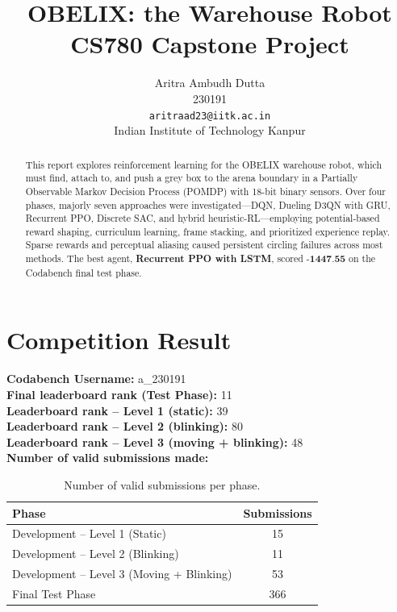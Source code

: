\documentclass[10.5pt, oneside]{article}
\title{OBELIX: the Warehouse Robot \\ \Large{CS780 Capstone Project}
}
\author{
    Aritra Ambudh Dutta  \\
    230191\\
   {\tt aritraad23@iitk.ac.in}\\
{Indian Institute of Technology Kanpur}
}
\date{}
\begin{document}
\maketitle

\begin{abstract}
This report explores reinforcement learning for the OBELIX warehouse robot, which must find, attach to, and push a grey box to the arena boundary in a Partially Observable Markov Decision Process (POMDP) with 18-bit binary sensors. Over four phases, majorly seven approaches were investigated---DQN, Dueling D3QN with GRU, Recurrent PPO, Discrete SAC, and hybrid heuristic-RL---employing potential-based reward shaping, curriculum learning, frame stacking, and prioritized experience replay. Sparse rewards and perceptual aliasing caused persistent circling failures across most methods. The best agent, \textbf{Recurrent PPO with LSTM}, scored $\textbf{-1447.55}$ on the Codabench final test phase.
\end{abstract}

\section{Competition Result}
\textbf{Codabench Username:} a\_230191 \\
\textbf{Final leaderboard rank (Test Phase):} 11 \\
\textbf{Leaderboard rank -- Level 1 (static):} 39 \\
\textbf{Leaderboard rank -- Level 2 (blinking):} 80 \\
\textbf{Leaderboard rank -- Level 3 (moving + blinking):} 48 \\

\textbf{Number of valid submissions made:}

\begin{table}[H]
\centering
\begin{tabular}{l c}
\toprule
\textbf{Phase} & \textbf{Submissions} \\
\midrule
Development -- Level 1 (Static) & 15 \\
Development -- Level 2 (Blinking) & 11 \\
Development -- Level 3 (Moving + Blinking) & 53 \\
Final Test Phase & 366 \\
\bottomrule
\end{tabular}
\caption{Number of valid submissions per phase.}
\end{table}
\end{document}
